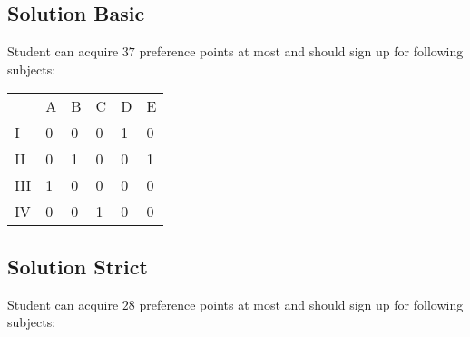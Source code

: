 \subsection{Solution Basic}
Student can acquire $37$ preference points at most and should sign up for following subjects:
\begin{table}[H]
    \centering

    \begin{tabular}{lccccc}
        & A                              & B                              & C                              & D                              & E                                 \\ \cline{2-6} 
\multicolumn{1}{l|}{I}   & \multicolumn{1}{l|}{0} & \multicolumn{1}{l|}{0} & \multicolumn{1}{l|}{0} & \multicolumn{1}{l|}{1}  & \multicolumn{1}{l|}{0}  \\ \cline{2-6} 
\multicolumn{1}{l|}{II}  & \multicolumn{1}{l|}{0} & \multicolumn{1}{l|}{1} & \multicolumn{1}{l|}{0} & \multicolumn{1}{l|}{0}  & \multicolumn{1}{l|}{1} \\ \cline{2-6} 
\multicolumn{1}{l|}{III} & \multicolumn{1}{l|}{1} & \multicolumn{1}{l|}{0} & \multicolumn{1}{l|}{0} & \multicolumn{1}{l|}{0} & \multicolumn{1}{l|}{0} \\ \cline{2-6} 
\multicolumn{1}{l|}{IV}  & \multicolumn{1}{l|}{0} & \multicolumn{1}{l|}{0} & \multicolumn{1}{l|}{1} & \multicolumn{1}{l|}{0} & \multicolumn{1}{l|}{0} \\ \cline{2-6} 
\end{tabular}

\end{table} 

\subsection{Solution Strict}
Student can acquire $28$ preference points at most and should sign up for following subjects:

